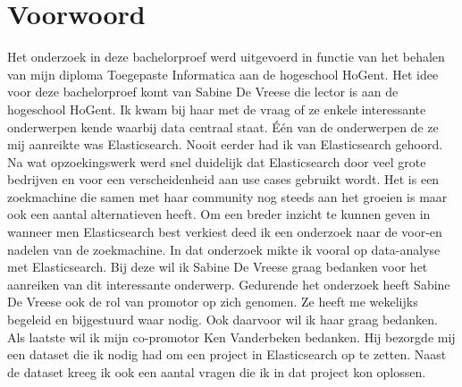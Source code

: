 
\chapter{Voorwoord}
\label{ch:voorwoord}


Het onderzoek in deze bachelorproef werd uitgevoerd in functie van het behalen van mijn diploma Toegepaste Informatica aan de hogeschool HoGent. Het idee voor deze bachelorproef komt van Sabine De Vreese die lector is aan de hogeschool HoGent. Ik kwam bij haar met de vraag of ze enkele interessante onderwerpen kende waarbij data centraal staat. Één van de onderwerpen de ze mij aanreikte was Elasticsearch. Nooit eerder had ik van Elasticsearch gehoord. Na wat opzoekingswerk werd snel duidelijk dat Elasticsearch door veel grote bedrijven en voor een verscheidenheid aan use cases gebruikt wordt. Het is een zoekmachine die samen met haar community nog steeds aan het groeien is maar ook een aantal alternatieven heeft. Om een breder inzicht te kunnen geven in wanneer men Elasticsearch best verkiest deed ik een onderzoek naar de voor-en nadelen van de zoekmachine. In dat onderzoek mikte ik vooral op data-analyse met Elasticsearch. Bij deze wil ik Sabine De Vreese graag bedanken voor het aanreiken van dit interessante onderwerp. Gedurende het onderzoek heeft Sabine De Vreese ook de rol van promotor op zich genomen. Ze heeft me wekelijks begeleid en bijgestuurd waar nodig. Ook daarvoor wil ik haar graag bedanken. Als laatste wil ik mijn co-promotor Ken Vanderbeken bedanken. Hij bezorgde mij een dataset die ik nodig had om een project in Elasticsearch op te zetten. Naast de dataset kreeg ik ook een aantal vragen die ik in dat project kon oplossen.

